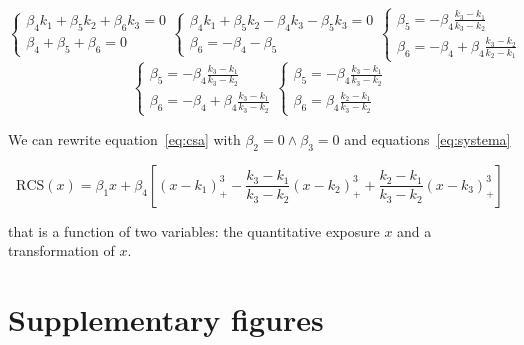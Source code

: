 \documentclass[11pt,a4paper,twoside,openany]{book}\usepackage{knitr}
\begin{document}
{{\begin{equation*}
\begin{cases}\beta_4k_1 + \beta_5k_2 + \beta_6k_3 = 0 \\ 
\beta_4 + \beta_5 + \beta_6 = 0 \end{cases}
\begin{cases}\beta_4k_1 + \beta_5k_2 - \beta_4k_3 - \beta_5 k_3 = 0 \\ 
\beta_6 = -\beta_4 - \beta_5 \end{cases}
\begin{cases}\beta_5 = -\beta_4\frac{k_3 - k_1}{k_3 - k_2} \\ 
\beta_6 = -\beta_4 + \beta_4\frac{k_3 - k_2}{k_2 - k_1} \end{cases}
\end{equation*}
\begin{equation}
\begin{cases}\beta_5 = -\beta_4\frac{k_3 - k_1}{k_3 - k_2} \\ 
\beta_6 = -\beta_4 + \beta_4\frac{k_3 - k_1}{k_3 - k_2} \end{cases}
\begin{cases}\beta_5 = -\beta_4\frac{k_3 - k_1}{k_3 - k_2} \\ 
\beta_6 = \beta_4 \frac{k_2 - k_1}{k_3 - k_2} \end{cases}
\label{eq:systema}
\end{equation}

\noindent We can rewrite equation~\ref{eq:csa} with $\beta_2 = 0 \land \beta_3 = 0$ and equations~\ref{eq:systema}

\begin{equation}
\mathrm{RCS}(x) = \beta_1 x + \beta_4 \left[ \left( x - k_1 \right)_{+}^3 - \frac{k_3 - k_1}{k_3 - k_2} \left( x - k_2  \right)_{+}^3 + \frac{k_2 - k_1}{k_3 - k_2} \left(x - k_3 \right)_{+}^3\right]
\label{eq:rcsfina}
\end{equation}

\noindent that is a function of two variables: the quantitative exposure $x$ and a transformation of $x$.


\chapter{Supplementary figures}

\begin{knitrout}\footnotesize
{}\color{fgcolor}\begin{figure}[ht!]


\end{figure}
\end{knitrout}}}
\end{document}
